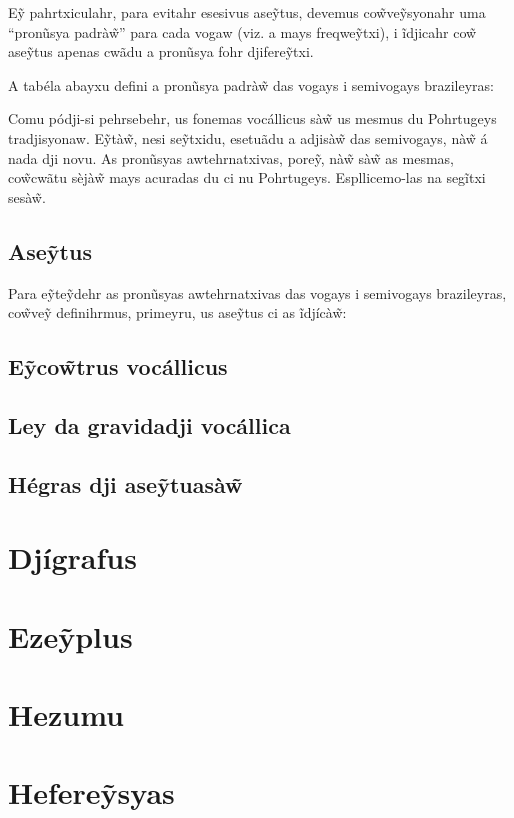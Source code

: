 \documentclass[12pt, a5paper, titlepage]{article}
\begin{document}
\begin{bilingualpages}
    E\~y pahrtxiculahr, para evitahr esesivus ase\~ytus, devemus co\~wve\~ysyonahr
    uma ``pronũsya padrà\~w'' para cada vogaw (viz. a mays freqwe\~ytxi), i
    ĩdjicahr co\~w ase\~ytus apenas cwãdu a pronũsya fohr djifere\~ytxi.

    A tabéla abayxu defini a pronũsya padrà\~w das vogays i semivogays brazileyras:

    \BrTableVowels

    Comu pódji-si pehrsebehr, us fonemas vocállicus sà\~w us mesmus du Pohrtugeys
    tradjisyonaw. E\~ytà\~w, nesi se\~ytxidu, esetuãdu a adjisà\~w das semivogays,
    nà\~w á nada dji novu. As pronũsyas awtehrnatxivas, pore\~y, nà\~w sà\~w as
    mesmas, co\~wcwãtu sèjà\~w mays acuradas du ci nu Pohrtugeys. Espllicemo-las na
    segĩtxi sesà\~w.

    \subsection{Ase\~ytus}
    Para e\~yte\~ydehr as pronũsyas awtehrnatxivas das vogays i semivogays
    brazileyras, co\~wve\~y definihrmus, primeyru, us ase\~ytus ci as ĩdjícà\~w:

    \BrTableDiacritics

    \subsection{E\~yco\~wtrus vocállicus}
    \subsection{Ley da gravidadji vocállica}
    \subsection{Hégras dji ase\~ytuasà\~w}

    \section{Djígrafus}

    \BrTableDigraphs

    \section{Eze\~yplus}

\end{bilingualpages}

\newpage
\section{Hezumu}

\newpage
\section{Hefere\~ysyas}
\end{document}
